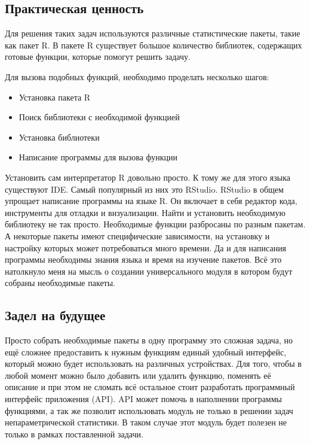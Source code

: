 \documentclass[14pt,a4paper]{scrartcl}
\begin{document}
    \subsection{Практическая ценность}
    Для решения таких задач используются различные статистические пакеты, такие как пакет R. В пакете R существует большое количество библиотек, содержащих готовые функции, которые помогут решить задачу.

    Для вызова подобных функций, необходимо проделать несколько шагов:

    \begin{itemize}[noitemsep]
        \item Установка пакета R
        \item Поиск библиотеки с необходимой функцией
        \item Установка библиотеки
        \item Написание программы для вызова функции
    \end{itemize}

    Установить сам интерпретатор R довольно просто. К тому же для этого языка существуют IDE. Самый популярный из них это RStudio. RStudio в общем упрощает написание программы на языке R. Он включает в себя редактор кода, инструменты для отладки и визуализации. Найти и установить необходимую библиотеку не так просто. Необходимые функции разбросаны по разным пакетам. А некоторые пакеты имеют специфические зависимости, на установку и настройку которых может потребоваться много времени. Да и для написания программы необходимы знания языка и время на изучение пакетов. Всё это натолкнуло меня на мысль о создании универсального модуля в котором будут собраны необходимые пакеты.

    \subsection[Задел на будущее]{Задел на будущее}
    Просто собрать необходимые пакеты в одну программу это сложная задача, но ещё сложнее предоставить к нужным функциям единый удобный интерфейс, который можно будет использовать на различных устройствах. Для того, чтобы в любой момент можно было добавить или удалить функцию, поменять её описание и при этом не сломать всё остальное стоит разработать программный интерфейс приложения (API). API может помочь в наполнении программы функциями, а так же позволит использовать модуль не только в решении задач непараметрической статистики. В таком случае этот модуль будет полезен не только в рамках поставленной задачи.
\end{document}
